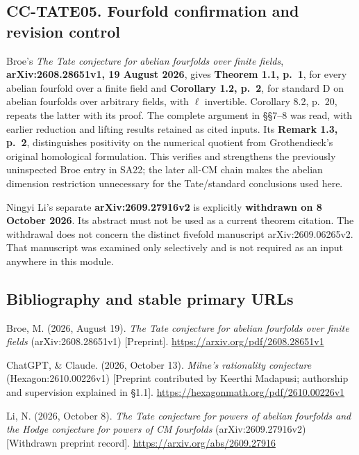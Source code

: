 \documentclass[11pt,a4paper]{article}
\theoremstyle{definition}\newtheorem{definition}[theorem]{Definition}
\theoremstyle{remark}\newtheorem{remark}[theorem]{Remark}
\begin{document}
\subsection{CC-TATE05. Fourfold confirmation and revision
control}\label{cc-tate05.-fourfold-confirmation-and-revision-control}

Broe's \emph{The Tate conjecture for abelian fourfolds over finite
fields}, \textbf{arXiv:2608.28651v1, 19 August 2026}, gives
\textbf{Theorem 1.1, p.~1}, for every abelian fourfold over a finite
field and \textbf{Corollary 1.2, p.~2}, for standard D on abelian
fourfolds over arbitrary fields, with \(\ell\) invertible. Corollary
8.2, p.~20, repeats the latter with its proof. The complete argument in
§§7--8 was read, with earlier reduction and lifting results retained as
cited inputs. Its \textbf{Remark 1.3, p.~2}, distinguishes positivity on
the numerical quotient from Grothendieck's original homological
formulation. This verifies and strengthens the previously uninspected
Broe entry in SA22; the later all-CM chain makes the abelian dimension
restriction unnecessary for the Tate/standard conclusions used here.

Ningyi Li's separate \textbf{arXiv:2609.27916v2} is explicitly
\textbf{withdrawn on 8 October 2026}. Its abstract must not be used as a
current theorem citation. The withdrawal does not concern the distinct
fivefold manuscript arXiv:2609.06265v2. That manuscript was examined
only selectively and is not required as an input anywhere in this
module.

\subsection{Bibliography and stable primary
URLs}\label{bibliography-and-stable-primary-urls}

Broe, M. (2026, August 19). \emph{The Tate conjecture for abelian
fourfolds over finite fields} (arXiv:2608.28651v1) {[}Preprint{]}.
\url{https://arxiv.org/pdf/2608.28651v1}

ChatGPT, \& Claude. (2026, October 13). \emph{Milne's rationality
conjecture} (Hexagon:2610.00226v1) {[}Preprint contributed by Keerthi
Madapusi; authorship and supervision explained in §1.1{]}.
\url{https://hexagonmath.org/pdf/2610.00226v1}

Li, N. (2026, October 8). \emph{The Tate conjecture for powers of
abelian fourfolds and the Hodge conjecture for powers of CM fourfolds}
(arXiv:2609.27916v2) {[}Withdrawn preprint record{]}.
\url{https://arxiv.org/abs/2609.27916}
\end{document}
